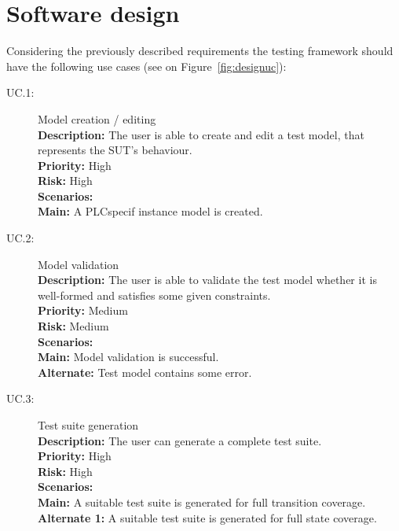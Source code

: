 

\section{Software design}
\label{sec:softwaredesign}

Considering the previously described requirements the testing framework should have the following use cases (see on Figure~\ref{fig:designuc}):

\begin{description}
	\item[UC.1:] Model creation / editing\\
		\textbf{Description:} The user is able to create and edit a test model, that represents the SUT's behaviour.\\
		\textbf{Priority:} High\\
		\textbf{Risk:} High\\
		\textbf{Scenarios:}\\
			\-\hspace{0,5cm}\textbf{Main:} A PLCspecif instance model is created.
	\item[UC.2:] Model validation\\
		\textbf{Description:} The user is able to validate the test model whether it is well-formed and satisfies some given constraints.\\
		\textbf{Priority:} Medium\\
		\textbf{Risk:} Medium\\
		\textbf{Scenarios:}\\
			\-\hspace{0,5cm}\textbf{Main:} Model validation is successful.\\
			\-\hspace{0,5cm}\textbf{Alternate:} Test model contains some error.
	\item[UC.3:] Test suite generation\\
		\textbf{Description:} The user can generate a complete test suite.\\
		\textbf{Priority:} High\\
		\textbf{Risk:} High\\
		\textbf{Scenarios:}\\
			\-\hspace{0,5cm}\textbf{Main:} A suitable test suite is generated for full transition coverage.\\
			\-\hspace{0,5cm}\textbf{Alternate 1:} A suitable test suite is generated for full state coverage.\\

\end{description}
